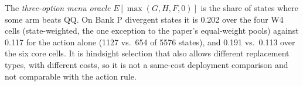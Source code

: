 The \emph{three-option menu oracle} $E[\max(G,H,F,0)]$ is the share of states where some arm beats QQ. On Bank P divergent states it is 0.202 over the four W4 cells (state-weighted, the one exception to the paper's equal-weight pools) against 0.117 for the action alone (1127 vs.\ 654 of 5576 states), and 0.191 vs.\ 0.113 over the six core cells. It is hindsight selection that also allows different replacement types, with different costs, so it is not a same-cost deployment comparison and not comparable with the action rule. %




